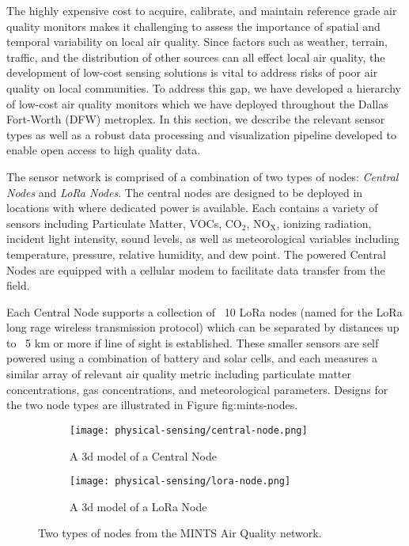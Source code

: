 The highly expensive cost to acquire, calibrate, and maintain reference grade air quality monitors makes it challenging to assess the importance of spatial and temporal variability on local air quality. Since factors such as weather, terrain, traffic, and the distribution of other sources can all effect local air quality, the development of low-cost sensing solutions is vital to address risks of poor air quality on local communities. To address this gap, we have developed a hierarchy of low-cost air quality monitors which we have deployed throughout the Dallas Fort-Worth (DFW) metroplex. In this section, we describe the relevant sensor types as well as a robust data processing and visualization pipeline developed to enable open access to high quality data.

The sensor network is comprised of a combination of two types of nodes: \textit{Central Nodes} and \textit{LoRa Nodes}. The central nodes are designed to be deployed in locations with where dedicated power is available. Each contains a variety of sensors including Particulate Matter, VOCs, $\mathrm{CO_2}$, $\mathrm{NO_X}$, ionizing radiation, incident light intensity, sound levels, as well as meteorological variables including temperature, pressure, relative humidity, and dew point. The powered Central Nodes are equipped with a cellular modem to facilitate data transfer from the field.

Each Central Node supports a collection of ~10 LoRa nodes (named for the LoRa long rage wireless transmission protocol) which can be separated by distances up to ~5 km or more if line of sight is established. These smaller sensors are self powered using a combination of battery and solar cells, and each measures a similar array of relevant air quality metric including particulate matter concentrations, gas concentrations, and meteorological parameters. Designs for the two node types are illustrated in Figure {fig:mints-nodes}.
\begin{figure}[!hbt]
  \begin{subfigure}{.5\textwidth}
    \centering
    \texttt{[image: physical-sensing/central-node.png]}
    \caption{A 3d model of a Central Node}
  \end{subfigure}
  \begin{subfigure}{.5\textwidth}
    \centering
    \texttt{[image: physical-sensing/lora-node.png]}
    \caption{A 3d model of a LoRa Node}
  \end{subfigure}
  \caption{Two types of nodes from the MINTS Air Quality network.}
  \label{fig:mints-nodes}
\end{figure}


